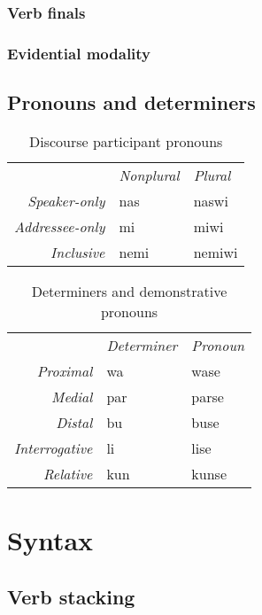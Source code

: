 \documentclass[a4paper,10pt,twoside,openright]{memoir}
\begin{document}
\subsection{Verb finals}

\subsection{Evidential modality}

\section{Pronouns and determiners}

\begin{table}[ht]
    \centering
    \begin{tabular}{rll}
        & \textit{Nonplural} & \textit{Plural} \\
    \textit{Speaker-only} & nas & naswi \\
    \textit{Addressee-only} & mi & miwi \\
    \textit{Inclusive} & nemi & nemiwi \\
    \end{tabular}
    \caption{Discourse participant pronouns}
    \label{tab:firstandsecond}
\end{table}

\begin{table}[ht]
    \centering
    \begin{tabular}{>{\em}rll}
        & \textit{Determiner} & \textit{Pronoun}  \\
    Proximal & wa & wase \\
    Medial & par & parse \\
    Distal & bu & buse \\
    Interrogative & li & lise \\
    Relative & kun & kunse 
    \end{tabular}
    \caption{Determiners and demonstrative pronouns}
    \label{tab:determiners}
\end{table}

\chapter{Syntax}

\section{Verb stacking}
\end{document}
